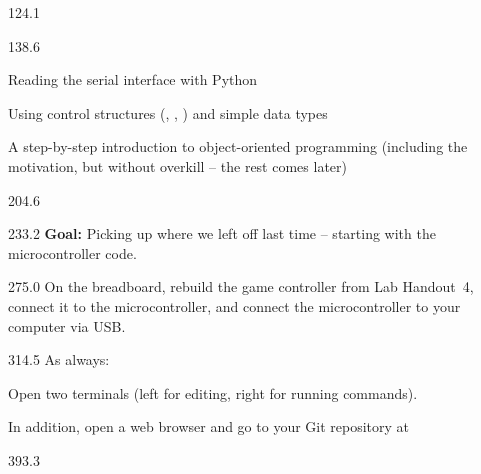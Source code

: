 \documentclass{aslab}
\begin{document}
\maketitleblock

\begin{region}{124.1}
\end{region}

\begin{region}[pitch=13.3]{138.6}
{\bfseries\color{aslabblue}
\begin{dashlist}
\item Reading the serial interface with Python
\item Using control structures ({\mdseries{}}, {\mdseries{}},
  {\mdseries{}}) and simple data types
\item A step-by-step introduction to object-oriented programming (including
  the motivation, but without overkill -- the rest comes later)
\end{dashlist}\par}
\end{region}

\begin{region}{204.6}
\end{region}

\begin{region}[pitch=14.2]{233.2}
\textbf{Goal:} Picking up where we left off last time -- starting with the
microcontroller code.
\end{region}

\begin{region}[pitch=13.2]{275.0}
On the breadboard, rebuild the game controller from Lab Handout~4, connect it
to the microcontroller, and connect the microcontroller to your computer via
USB.
\end{region}

\begin{region}[pitch=13.2]{314.5}
As always:
\begin{dashlist}
\item Open two terminals (left for editing, right for running commands).
\item In addition, open a web browser and go to your Git repository at\\
\end{dashlist}
\end{region}

\begin{region}{393.3}
\end{region}
\end{document}
